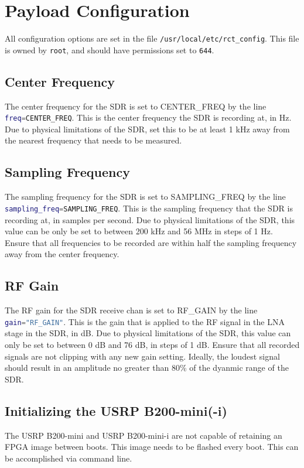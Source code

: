 \documentclass{report}
\begin{document}
		\section{Payload Configuration}
			All configuration options are set in the file \lstinline[language=sh]{/usr/local/etc/rct_config}.  This file is owned by \lstinline[language=sh]{root}, and should have permissions set to \lstinline{644}.
			\subsection{Center Frequency}
				The center frequency for the SDR is set to CENTER\_FREQ by the line \lstinline[language=sh]{freq=CENTER_FREQ}.  This is the center frequency the SDR is recording at, in Hz.  Due to physical limitations of the SDR, set this to be at least 1 kHz away from the nearest frequency that needs to be measured.
			\subsection{Sampling Frequency}
				The sampling frequency for the SDR is set to SAMPLING\_FREQ by the line \lstinline[language=sh]{sampling_freq=SAMPLING_FREQ}.  This is the sampling frequency that the SDR is recording at, in samples per second.  Due to physical limitations of the SDR, this value can be only be set to between 200 kHz and 56 MHz in steps of 1 Hz.  Ensure that all frequencies to be recorded are within half the sampling frequency away from the center frequency.
			\subsection{RF Gain}
				The RF gain for the SDR receive chan is set to RF\_GAIN by the line \lstinline[language=sh]{gain="RF_GAIN"}.  This is the gain that is applied to the RF signal in the LNA stage in the SDR, in dB.  Due to physical limitations of the SDR, this value can only be set to between 0 dB and 76 dB, in steps of 1 dB.  Ensure that all recorded signals are not clipping with any new gain setting.  Ideally, the loudest signal should result in an amplitude no greater than 80\% of the dyanmic range of the SDR.
			\subsection{Initializing the USRP B200-mini(-i)}
				The USRP B200-mini and USRP B200-mini-i are not capable of retaining an FPGA image between boots.  This image needs to be flashed every boot.  This can be accomplished via command line.
\end{document}
